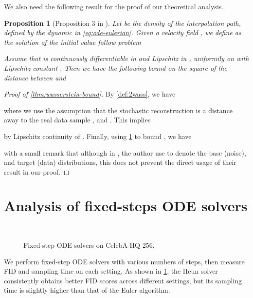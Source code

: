\documentclass{article}
\theoremstyle{plain}
\newtheorem{proposition}[theorem]{Proposition}
\theoremstyle{definition}
\theoremstyle{remark}
\begin{document}
We also need the following result for the proof of our theoretical analysis.
\begin{proposition}[Proposition 3 in \cite{albergo2022building}]
  \label{prop:3-albergo2022}
  Let  be the density of  the interpolation path, defined by the dynamic in \eqref{eq:ode-eulerian}.
Given a velocity field , we define  as the solution of the initial value follow problem

Assume that  is continuously differentiable in  and Lipschitz in , uniformily on  with Lipschitz constant .
  Then we have the following bound on the square of the  distance between  and 

\end{proposition}



\begin{proof}[Proof of \cref{thm:wasserstein-bound}]
  By \cref{def:2wass}, we have

  where we use the assumption that the stochastic reconstruction  is a distance  away to the real data sample , and .
This implies

by Lipschitz continuity of .
Finally, using \cref{prop:3-albergo2022} to bound , we have

with a small remark that although in \cite{albergo2022building}, the author use  to denote the base (noise), and  target (data) distributions, this does not prevent the direct usage of their result in our proof.
  
\end{proof}

\section{Analysis of fixed-steps ODE solvers}
\label{sec:ode_analysis}
\begin{figure}[t]
\centering
{}
~
\caption{Fixed-step ODE solvers on CelebA-HQ 256.}
    \label{fig:solver_analysis}
\vspace{-2mm}
\end{figure}

We perform fixed-step ODE solvers with various numbers of steps, then measure FID and sampling time on each setting. As shown in \cref{fig:solver_analysis}, the Heun solver consistently obtains better FID scores across different settings, but its sampling time is slightly higher than that of the Euler algorithm.
\end{document}
